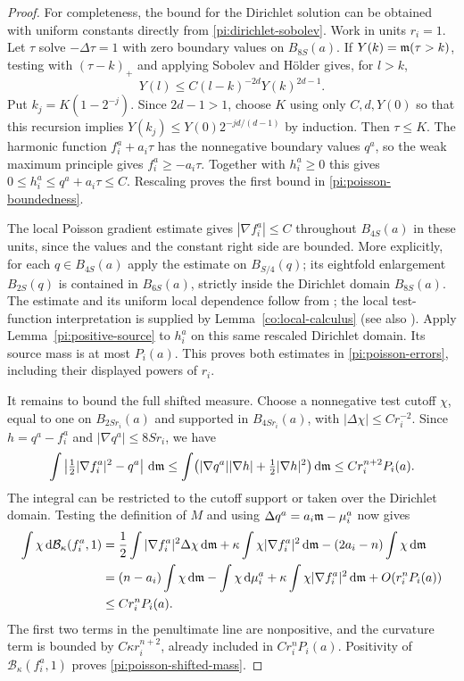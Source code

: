 \begin{proof}
For completeness, the bound for the Dirichlet solution can be obtained
with uniform constants directly from
\eqref{pi:dirichlet-sobolev}.  Work in units $r_i=1$.  Let $\tau$
solve $-\Delta\tau=1$ with zero boundary values on $B_{8S}(a)$.
If $Y(k)=\mathfrak m(\tau>k)$, testing with $(\tau-k)_+$ and applying
Sobolev and H\"older gives, for $l>k$,
\[
 Y(l)\le C(l-k)^{-2d}Y(k)^{2d-1}.
\]
Put $k_j=K(1-2^{-j})$.  Since $2d-1>1$, choose $K$ using only
$C,d,Y(0)$ so that this recursion implies
$Y(k_j)\le Y(0)2^{-jd/(d-1)}$ by induction.  Then
$\tau\le K$.  The harmonic function $f_i^a+a_i\tau$ has the
nonnegative boundary values $q^a$, so the weak maximum principle
gives $f_i^a\ge-a_i\tau$.  Together with $h_i^a\ge0$ this gives
$0\le h_i^a\le q^a+a_i\tau\le C$.  Rescaling proves the first
bound in \eqref{pi:poisson-boundedness}.

 The local Poisson gradient estimate gives $|\nabla f_i^a|\le C$
throughout $B_{4S}(a)$ in these units, since the values and the
constant right side are bounded.  More explicitly, for each
$q\in B_{4S}(a)$ apply the estimate on $B_{S/4}(q)$; its
eightfold enlargement $B_{2S}(q)$ is contained in $B_{6S}(a)$,
strictly inside the Dirichlet domain $B_{8S}(a)$.
The estimate
and its uniform local dependence follow from \cite{Kell13,Jiang14};
the local test-function interpretation is supplied by
Lemma~\ref{co:local-calculus} (see also \cite{CDNZPSW}).
Apply Lemma~\ref{pi:positive-source} to $h_i^a$ on this same
rescaled Dirichlet domain.  Its source mass is at most $P_i(a)$.
This proves both estimates in \eqref{pi:poisson-errors}, including
their displayed powers of $r_i$.

It remains to bound the full shifted measure.  Choose a nonnegative
test cutoff $\chi$, equal to one on $B_{2Sr_i}(a)$ and supported
in $B_{4Sr_i}(a)$, with $|\Delta\chi|\le Cr_i^{-2}$.
Since $h=q^a-f_i^a$ and $|\nabla q^a|\le8Sr_i$, we have
\[
 \int\left|\tfrac12|\nabla f_i^a|^2-q^a\right|\,\mathrm d\mathfrak m
 \le\int\bigl(|\nabla q^a||\nabla h|
                  +\tfrac12|\nabla h|^2\bigr)\,\mathrm d\mathfrak m
 \le Cr_i^{n+2}P_i(a).
\]
The integral can be restricted to the cutoff support or taken over
the Dirichlet domain.  Testing the definition of $M$ and using
$\Delta q^a=a_i\mathfrak m-\mu_i^a$ now gives
\begin{align*}
 \int\chi\,\mathrm d\mathcal B_\kappa(f_i^a,1)
 &=\frac12\int|\nabla f_i^a|^2\Delta\chi\,\mathrm d\mathfrak m
   +\kappa\int\chi|\nabla f_i^a|^2\,\mathrm d\mathfrak m
   -(2a_i-n)\int\chi\,\mathrm d\mathfrak m\\
 &=(n-a_i)\int\chi\,\mathrm d\mathfrak m-\int\chi\,\mathrm d\mu_i^a
   +\kappa\int\chi|\nabla f_i^a|^2\,\mathrm d\mathfrak m
   +O(r_i^nP_i(a))\\
 &\le Cr_i^nP_i(a).
\end{align*}
The first two terms in the penultimate line are nonpositive, and
the curvature term is bounded by $C\kappa r_i^{n+2}$, already
included in $Cr_i^nP_i(a)$.  Positivity of
$\mathcal B_\kappa(f_i^a,1)$ proves
\eqref{pi:poisson-shifted-mass}.
\end{proof}

